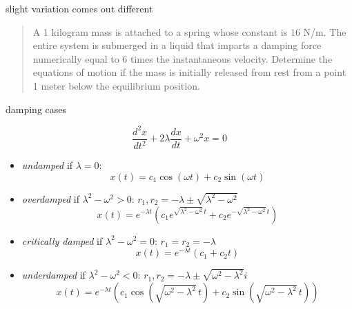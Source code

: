\documentclass[urlcolor=blue,dvipsnames]{beamer}
\begin{document}
\begin{frame}{slight variation comes out different}

\begin{quotation}
\noindent A 1 kilogram mass is attached to a spring whose constant is $16$ N/m.  The entire system is submerged in a liquid that imparts a damping force numerically equal to 6 times the instantaneous velocity.  Determine the equations of motion if the mass is initially released from rest from a point 1 meter below the equilibrium position.\end{quotation}

\vspace{50mm}
\end{frame}


\begin{frame}{damping cases}

$$\frac{d^2x}{dt^2} + 2 \lambda \frac{dx}{dt} + \omega^2 x=0$$

\begin{itemize}
\item \alert{\emph{undamped} if $\lambda = 0$}:
    $$x(t)=c_1 \cos(\omega t) + c_2 \sin(\omega t)$$
\item \alert{\emph{overdamped} if $\lambda^2-\omega^2 > 0$}: \hfill {\scriptsize $\boxed{r_1,r_2 = -\lambda \pm \sqrt{\lambda^2 - \omega^2}}$}
    $$x(t)=e^{-\lambda t} \left(c_1 e^{\sqrt{\lambda^2 - \omega^2}\, t} + c_2 e^{- \sqrt{\lambda^2 - \omega^2}\, t}\right)$$
\item \alert{\emph{critically damped} if $\lambda^2-\omega^2 = 0$}: \hfill {\scriptsize $\boxed{r_1=r_2 = -\lambda}$}
    $$x(t)=e^{-\lambda t} (c_1 + c_2 t)$$
\item \alert{\emph{underdamped} if $\lambda^2-\omega^2 < 0$}: \hfill {\scriptsize$\boxed{r_1,r_2 = -\lambda \pm \sqrt{\omega^2 - \lambda^2} i}$}
    $$x(t)=e^{-\lambda t} \left(c_1 \cos(\sqrt{\omega^2 - \lambda^2}\, t) + c_2 \sin(\sqrt{\omega^2 - \lambda^2}\, t)\right)$$
\end{itemize}
\end{frame}
\end{document}

